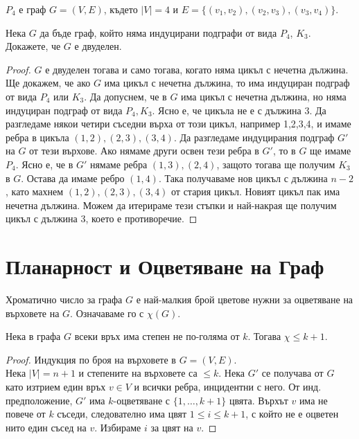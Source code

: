 \begin{dfn}
  $P_4$ е граф $G=(V,E)$, където $|V| = 4$ и $E = \{(v_1,v_2), (v_2,v_3), (v_3,v_4)\}$.
\end{dfn}


\begin{problem}
  Нека $G$ да бъде граф, който няма индуцирани подграфи от вида $P_4$, $K_3$.
  Докажете, че $G$ е двуделен.
\end{problem}
\begin{proof}
  $G$ е двуделен тогава и само тогава, когато няма цикъл с нечетна дължина.
  Ще докажем, че ако $G$ има цикъл с нечетна дължина, то има индуциран подграф от вида $P_4$ или $K_3$.
  Да допуснем, че в $G$ има цикъл с нечетна дължина, но няма индуциран подграф от вида $P_4, K_3$.
  Ясно е, че цикъла не е с дължина 3.
  Да разгледаме някои четири съседни върха от този цикъл, например 1,2,3,4, и имаме ребра в цикъла $(1,2),(2,3),(3,4)$.
  Да разгледаме индуцирания подграф $G'$ на $G$ от тези върхове.
  Ако нямаме други освен тези ребра в $G'$, то в $G$ ще имаме $P_4$.
  Ясно е, че в $G'$ нямаме ребра $(1,3), (2,4)$, защото тогава ще получим $K_3$ в $G$.
  Остава да имаме ребро $(1,4)$. Така получаваме нов цикъл с дължина $n-2$, като махнем $(1,2),(2,3),(3,4)$ от стария цикъл.
  Новият цикъл пак има нечетна дължина.
  Можем да итерираме тези стъпки и най-накрая ще получим цикъл с дължина 3, което е противоречие.
\end{proof}



\section{Планарност и Оцветяване на Граф}


\begin{dfn}
  Хроматично число за графа $G$ е най-малкия брой цветове нужни за оцветяване на върховете на $G$.
  Означаваме го с $\chi(G)$.
\end{dfn}

\begin{problem}
  Нека в графа $G$ всеки връх има степен не по-голяма от $k$.
  Тогава $\chi \leq k+1$.
\end{problem}
\begin{proof}
  Индукция по броя на върховете в $G=(V,E)$.\\
  Нека $|V| = n+1$ и степените на върховете са $\leq k$.
  Нека $G'$ се получава от $G$ като изтрием един връх $v\in V$ и всички ребра, инцидентни с него.
  От инд. предположение, $G'$ има $k$-оцветяване с $\{1,\dots,k+1\}$ цвята.
  Върхът $v$ има не повече от $k$ съседи, следователно има цвят $1 \leq i \leq k+1$, с който не е оцветен нито един съсед на $v$.
  Избираме $i$ за цвят на $v$.
\end{proof}


